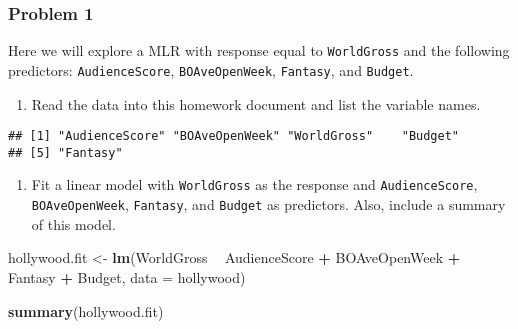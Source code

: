 \documentclass[]{article}
\newenvironment{Shaded}{\begin{snugshade}}{\end{snugshade}}
\newcommand{\DataTypeTok}[1]{\textcolor[rgb]{0.13,0.29,0.53}{#1}}
\newcommand{\KeywordTok}[1]{\textcolor[rgb]{0.13,0.29,0.53}{\textbf{#1}}}
\newcommand{\NormalTok}[1]{#1}
\newcommand{\OperatorTok}[1]{\textcolor[rgb]{0.81,0.36,0.00}{\textbf{#1}}}
\newcommand{\StringTok}[1]{\textcolor[rgb]{0.31,0.60,0.02}{#1}}
\providecommand{\tightlist}{%
  \setlength{\itemsep}{0pt}\setlength{\parskip}{0pt}}
\begin{document}
\hypertarget{problem-1}{%
\subsubsection{Problem 1}\label{problem-1}}

Here we will explore a MLR with response equal to \texttt{WorldGross}
and the following predictors: \texttt{AudienceScore},
\texttt{BOAveOpenWeek}, \texttt{Fantasy}, and \texttt{Budget}.

\begin{enumerate}
\def\labelenumi{\alph{enumi})}
\tightlist
\item
  Read the data into this homework document and list the variable names.
\end{enumerate}

\begin{Shaded}
\end{Shaded}

\begin{verbatim}
## [1] "AudienceScore" "BOAveOpenWeek" "WorldGross"    "Budget"       
## [5] "Fantasy"
\end{verbatim}

\begin{enumerate}
\def\labelenumi{\alph{enumi})}
\setcounter{enumi}{1}
\tightlist
\item
  Fit a linear model with \texttt{WorldGross} as the response and
  \texttt{AudienceScore}, \texttt{BOAveOpenWeek}, \texttt{Fantasy}, and
  \texttt{Budget} as predictors. Also, include a summary of this model.
\end{enumerate}

\begin{Shaded}
\begin{Highlighting}[]
\NormalTok{hollywood.fit <-}\StringTok{ }\KeywordTok{lm}\NormalTok{(WorldGross }\OperatorTok{~}\StringTok{ }\NormalTok{AudienceScore }\OperatorTok{+}\StringTok{ }\NormalTok{BOAveOpenWeek }\OperatorTok{+}\StringTok{ }\NormalTok{Fantasy }\OperatorTok{+}\StringTok{ }\NormalTok{Budget, }\DataTypeTok{data =}\NormalTok{ hollywood)}

\KeywordTok{summary}\NormalTok{(hollywood.fit)}
\end{Highlighting}
\end{Shaded}
\end{document}
